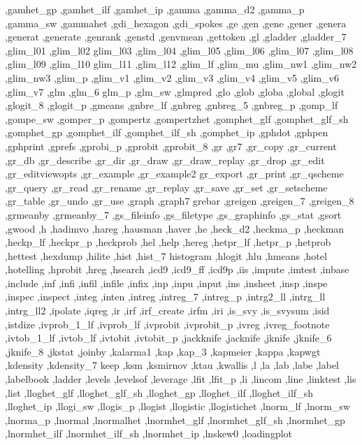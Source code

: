 {{    ,gamhet_gp ,gamhet_ilf ,gamhet_ip ,gamma ,gamma_d2 ,gamma_p
    ,gamma_sw ,gammahet ,gdi_hexagon ,gdi_spokes ,ge ,gen ,gene ,gener
    ,genera ,generat ,generate ,genrank ,genstd ,genvmean ,gettoken
    ,gl ,gladder ,gladder_7 ,glim_l01 ,glim_l02 glim_l03 ,glim_l04
    ,glim_l05 ,glim_l06 ,glim_l07 ,glim_l08 ,glim_l09 ,glim_l10 glim_l11
    ,glim_l12 ,glim_lf ,glim_mu ,glim_nw1 ,glim_nw2 ,glim_nw3 ,glim_p
    ,glim_v1 ,glim_v2 ,glim_v3 ,glim_v4 ,glim_v5 ,glim_v6 ,glim_v7 ,glm
    ,glm_6 glm_p ,glm_sw ,glmpred ,glo ,glob ,globa ,global ,glogit
    ,glogit_8 ,glogit_p ,gmeans ,gnbre_lf ,gnbreg ,gnbreg_5 ,gnbreg_p
    ,gomp_lf ,gompe_sw ,gomper_p ,gompertz ,gompertzhet ,gomphet_glf
    ,gomphet_glf_sh ,gomphet_gp ,gomphet_ilf ,gomphet_ilf_sh ,gomphet_ip
    ,gphdot ,gphpen ,gphprint ,gprefs ,gprobi_p ,gprobit ,gprobit_8
    ,gr ,gr7 ,gr_copy ,gr_current ,gr_db ,gr_describe ,gr_dir ,gr_draw
    ,gr_draw_replay ,gr_drop ,gr_edit ,gr_editviewopts ,gr_example
    ,gr_example2 gr_export ,gr_print ,gr_qscheme ,gr_query ,gr_read
    ,gr_rename ,gr_replay ,gr_save ,gr_set ,gr_setscheme ,gr_table
    ,gr_undo ,gr_use ,graph ,graph7 grebar ,greigen ,greigen_7
    ,greigen_8 ,grmeanby ,grmeanby_7 ,gs_fileinfo ,gs_filetype
    ,gs_graphinfo ,gs_stat ,gsort ,gwood ,h ,hadimvo ,hareg ,hausman
    ,haver ,he ,heck_d2 ,heckma_p ,heckman ,heckp_lf ,heckpr_p ,heckprob
    ,hel ,help ,hereg ,hetpr_lf ,hetpr_p ,hetprob ,hettest ,hexdump
    ,hilite ,hist ,hist_7 histogram ,hlogit ,hlu ,hmeans ,hotel
    ,hotelling ,hprobit ,hreg ,hsearch ,icd9 ,icd9_ff ,icd9p ,iis
    ,impute ,imtest ,inbase ,include ,inf ,infi ,infil ,infile ,infix
    ,inp ,inpu ,input ,ins ,insheet ,insp ,inspe ,inspec ,inspect ,integ
    ,inten ,intreg ,intreg_7 ,intreg_p ,intrg2_ll ,intrg_ll ,intrg_ll2
    ,ipolate ,iqreg ,ir ,irf ,irf_create ,irfm ,iri ,is_svy ,is_svysum
    ,isid ,istdize ,ivprob_1_lf ,ivprob_lf ,ivprobit ,ivprobit_p ,ivreg
    ,ivreg_footnote ,ivtob_1_lf ,ivtob_lf ,ivtobit ,ivtobit_p ,jackknife
    ,jacknife ,jknife ,jknife_6 ,jknife_8 ,jkstat ,joinby ,kalarma1
    ,kap ,kap_3 ,kapmeier ,kappa ,kapwgt ,kdensity ,kdensity_7 keep
    ,ksm ,ksmirnov ,ktau ,kwallis ,l ,la ,lab ,labe ,label ,labelbook
    ,ladder ,levels ,levelsof ,leverage ,lfit ,lfit_p ,li ,lincom ,line
    ,linktest ,lis ,list ,lloghet_glf ,lloghet_glf_sh ,lloghet_gp
    ,lloghet_ilf ,lloghet_ilf_sh ,lloghet_ip ,llogi_sw ,llogis_p
    ,llogist ,llogistic ,llogistichet ,lnorm_lf ,lnorm_sw ,lnorma_p
    ,lnormal ,lnormalhet ,lnormhet_glf ,lnormhet_glf_sh ,lnormhet_gp
    ,lnormhet_ilf ,lnormhet_ilf_sh ,lnormhet_ip ,lnskew0 ,loadingplot
}}
